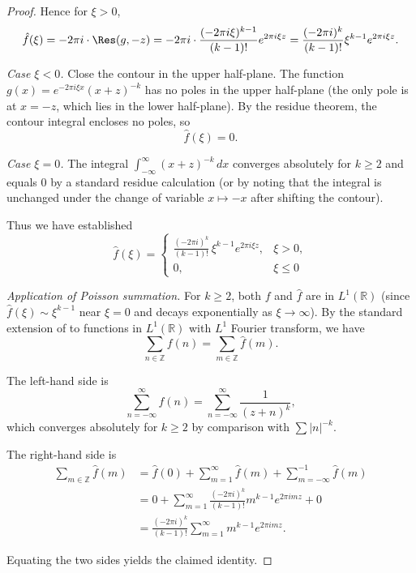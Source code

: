 \begin{proof}
Hence for $\xi > 0$,
$$\hat{f}(\xi) = -2\pi i \cdot \Res(g, -z) = -2\pi i \cdot \frac{(-2\pi i \xi)^{k-1}}{(k-1)!} e^{2\pi i \xi z} = \frac{(-2\pi i)^k}{(k-1)!} \xi^{k-1} e^{2\pi i \xi z}.$$

\medskip
\noindent\textit{Case $\xi < 0$.} Close the contour in the upper half-plane. The function $g(x) = e^{-2\pi i \xi x} (x+z)^{-k}$ has no poles in the upper half-plane (the only pole is at $x = -z$, which lies in the lower half-plane). By the residue theorem, the contour integral encloses no poles, so
$$\hat{f}(\xi) = 0.$$

\medskip
\noindent\textit{Case $\xi = 0$.} The integral $\int_{-\infty}^{\infty} (x+z)^{-k} \, dx$ converges absolutely for $k \geq 2$ and equals $0$ by a standard residue calculation (or by noting that the integral is unchanged under the change of variable $x \mapsto -x$ after shifting the contour).

Thus we have established
$$\hat{f}(\xi) = \begin{cases}
\displaystyle \frac{(-2\pi i)^k}{(k-1)!} \, \xi^{k-1} e^{2\pi i \xi z}, & \xi > 0, \\[1em]
0, & \xi \leq 0
\end{cases}$$

\medskip
\noindent\textit{Application of Poisson summation.} For $k \geq 2$, both $f$ and $\hat{f}$ are in $L^1(\mathbb{R})$ (since $\hat{f}(\xi) \sim \xi^{k-1}$ near $\xi = 0$ and decays exponentially as $\xi \to \infty$). By the standard extension of  to functions in $L^1(\mathbb{R})$ with $L^1$ Fourier transform, we have
$$\sum_{n \in \mathbb{Z}} f(n) = \sum_{m \in \mathbb{Z}} \hat{f}(m).$$

The left-hand side is
$$\sum_{n=-\infty}^{\infty} f(n) = \sum_{n=-\infty}^{\infty} \frac{1}{(z+n)^k},$$
which converges absolutely for $k \geq 2$ by comparison with $\sum |n|^{-k}$.

The right-hand side is
\begin{align*}
\sum_{m \in \mathbb{Z}} \hat{f}(m) &= \hat{f}(0) + \sum_{m=1}^{\infty} \hat{f}(m) + \sum_{m=-\infty}^{-1} \hat{f}(m) \\
&= 0 + \sum_{m=1}^{\infty} \frac{(-2\pi i)^k}{(k-1)!} m^{k-1} e^{2\pi i m z} + 0 \\
&= \frac{(-2\pi i)^k}{(k-1)!} \sum_{m=1}^{\infty} m^{k-1} e^{2\pi i m z}.
\end{align*}

Equating the two sides yields the claimed identity.
\end{proof}